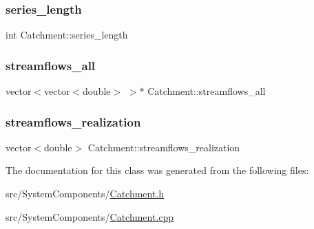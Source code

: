 \mbox{\label{classCatchment_a2d4994220f63b876348b4ce4892bc6d3_a2d4994220f63b876348b4ce4892bc6d3}} 
\subsubsection{\texorpdfstring{series\+\_\+length}{series\_length}}
{\footnotesize\ttfamily int Catchment\+::series\+\_\+length\hspace{0.3cm}{\ttfamily [protected]}}

\mbox{\label{classCatchment_a579ccda86831f286c19c76354e7125c3_a579ccda86831f286c19c76354e7125c3}} 
\subsubsection{\texorpdfstring{streamflows\+\_\+all}{streamflows\_all}}
{\footnotesize\ttfamily vector$<$vector$<$double$>$ $>$$\ast$ Catchment\+::streamflows\+\_\+all\hspace{0.3cm}{\ttfamily [protected]}}

\mbox{\label{classCatchment_aaf04c295ecd6b666fa1439d3d5bc072a_aaf04c295ecd6b666fa1439d3d5bc072a}} 
\subsubsection{\texorpdfstring{streamflows\+\_\+realization}{streamflows\_realization}}
{\footnotesize\ttfamily vector$<$double$>$ Catchment\+::streamflows\+\_\+realization\hspace{0.3cm}{\ttfamily [protected]}}



The documentation for this class was generated from the following files\+:\begin{DoxyCompactItemize}
\item 
src/\+System\+Components/\mbox{\hyperlink{Catchment_8h}{Catchment.\+h}}\item 
src/\+System\+Components/\mbox{\hyperlink{Catchment_8cpp}{Catchment.\+cpp}}\end{DoxyCompactItemize}
